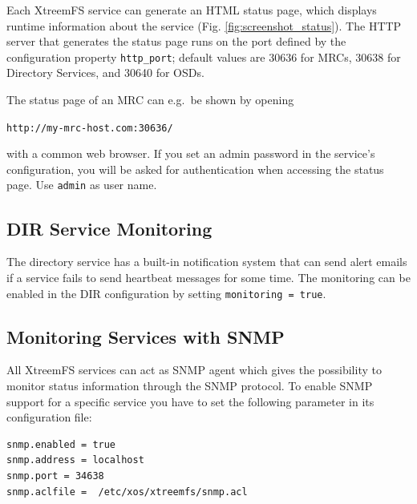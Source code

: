\documentclass[a4paper,10pt]{book}
\begin{document}
Each XtreemFS service can generate an HTML status page, which displays runtime information about the service (Fig. \ref{fig:screenshot_status}). The HTTP server that generates the status page runs on the port defined by the configuration property \texttt{http\_port}; default values are 30636 for MRCs, 30638 for Directory Services, and 30640 for OSDs.

The status page of an MRC can e.g.\ be shown by opening

\texttt{http://my-mrc-host.com:30636/}

with a common web browser. If you set an admin password in the service's configuration, you will be asked for authentication when accessing the status page. Use \texttt{admin} as user name.

\subsection{DIR Service Monitoring}

The directory service has a built-in notification system that can send alert emails if a service fails to send heartbeat messages for some time. The monitoring can be enabled in the DIR configuration by setting \texttt{monitoring = true}.

\subsection{Monitoring Services with SNMP}
\label{sec:snmpmonitoring}
All XtreemFS services can act as SNMP agent which gives the possibility to monitor status information through the SNMP protocol. To enable SNMP support for a specific service you have to set the following parameter in its configuration file: 

\begin{verbatim}
snmp.enabled = true
snmp.address = localhost
snmp.port = 34638
snmp.aclfile =  /etc/xos/xtreemfs/snmp.acl
\end{verbatim}
\end{document}
